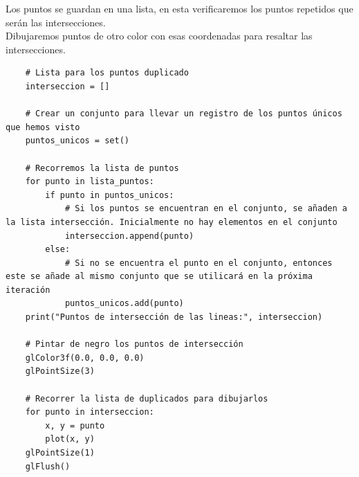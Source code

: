 \documentclass[a4paper]{article}
\begin{document}
Los puntos se guardan en una lista, en esta verificaremos los puntos repetidos que serán las intersecciones.\\ 
Dibujaremos puntos de otro color con esas coordenadas para resaltar las intersecciones.
\begin{center}
    
\begin{mycodeboxl}
\begin{lstlisting}
    # Lista para los puntos duplicado
    interseccion = []

    # Crear un conjunto para llevar un registro de los puntos únicos que hemos visto
    puntos_unicos = set()

    # Recorremos la lista de puntos
    for punto in lista_puntos:
        if punto in puntos_unicos:
            # Si los puntos se encuentran en el conjunto, se añaden a la lista intersección. Inicialmente no hay elementos en el conjunto 
            interseccion.append(punto)
        else:
            # Si no se encuentra el punto en el conjunto, entonces este se añade al mismo conjunto que se utilicará en la próxima iteración
            puntos_unicos.add(punto)
    print("Puntos de intersección de las lineas:", interseccion)

    # Pintar de negro los puntos de intersección
    glColor3f(0.0, 0.0, 0.0)
    glPointSize(3)

    # Recorrer la lista de duplicados para dibujarlos 
    for punto in interseccion:
        x, y = punto
        plot(x, y)
    glPointSize(1)
    glFlush()
\end{lstlisting}
\end{mycodeboxl}
\end{center}
\end{document}
